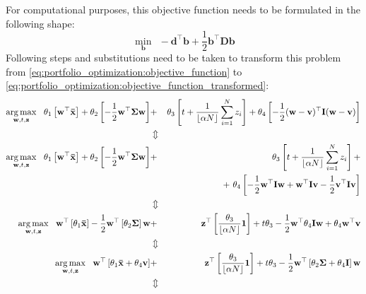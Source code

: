 For computational purposes, this objective function needs to be formulated in the following shape:
\begin{equation}
\min_{\mathbf{b}} \ \ -\mathbf{d}^\top \mathbf{b} + \frac{1}{2} \mathbf{b}^\top \mathbf{D} \mathbf{b}
\label{eq:portfolio_optimization:objective_function_transformed}
\end{equation}
Following steps and substitutions need to be taken to transform this problem from \ref{eq:portfolio_optimization:objective_function} to \ref{eq:portfolio_optimization:objective_function_transformed}:
\begin{eqnarray}
\argmax_{\mathbf{w},t,\mathbf{z}} \ \ \theta_1 \left[\mathbf{w}^\top \mathbf{\bar{x}}\right] + \theta_2 \left[-\frac{1}{2} \mathbf{w}^\top\mathbf{\Sigma} \mathbf{w}\right] &+& \theta_3\left[t + \frac{1}{\lfloor{\alpha N}\rfloor} \sum_{i=1}^{N} z_i\right] + \theta_4\left[ -\frac{1}{2} (\mathbf{w}-\mathbf{v})^\top\mathbf{I}(\mathbf{w}-\mathbf{v})\right]\nonumber \\
&\Updownarrow& \nonumber\\
\argmax_{\mathbf{w},t,\mathbf{z}} \ \ \theta_1 \left[\mathbf{w}^\top \mathbf{\bar{x}}\right] + \theta_2 \left[-\frac{1}{2} \mathbf{w}^\top\mathbf{\Sigma} \mathbf{w}\right] &+& \theta_3\left[t + \frac{1}{\lfloor{\alpha N}\rfloor} \sum_{i=1}^{N} z_i\right] +\nonumber \\  & & \ \ \ \ \ \ \ \ + \ \theta_4\left[ -\frac{1}{2} \mathbf{w}^\top\mathbf{I}\mathbf{w} + \mathbf{w}^\top\mathbf{I}\mathbf{v} -\frac{1}{2} \mathbf{v}^\top\mathbf{I}\mathbf{v}\right] \\
&\Updownarrow& \nonumber\\
\argmax_{\mathbf{w},t,\mathbf{z}} \ \ \mathbf{w}^\top\left[\theta_1\mathbf{\bar{x}}\right] -\frac{1}{2}\mathbf{w}^\top\left[\theta_2\mathbf{\Sigma}\right] \mathbf{w} &+& \mathbf{z}^\top\left[\frac{\theta_3}{\lfloor{\alpha N}\rfloor}\mathbf{1}\right] + t \theta_3  - \frac{1}{2} \mathbf{w}^\top \theta_4 \mathbf{I} \mathbf{w} + \theta_4 \mathbf{w}^\top \mathbf{v} \\
&\Updownarrow& \nonumber\\
\argmax_{\mathbf{w},t,\mathbf{z}} \ \ \mathbf{w}^\top\left[\theta_1\mathbf{\bar{x}}+ \theta_4 \mathbf{v} \right] &+& \mathbf{z}^\top\left[\frac{\theta_3}{\lfloor{\alpha N}\rfloor}\mathbf{1}\right] + t \theta_3  -\frac{1}{2}\mathbf{w}^\top\left[\theta_2\mathbf{\Sigma} +\theta_4 \mathbf{I} \right] \mathbf{w} \\
&\Updownarrow& \nonumber\\

\end{eqnarray}
